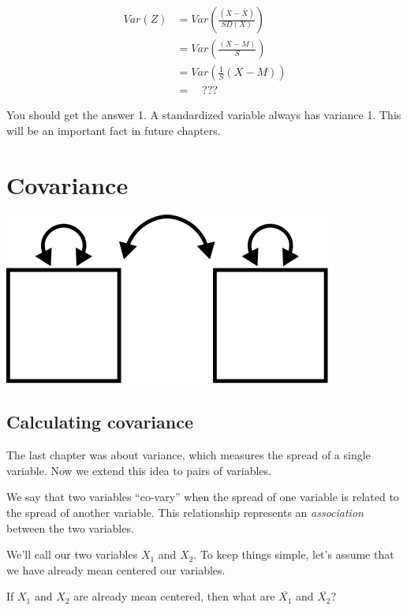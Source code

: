 \documentclass[
]{book}
\begin{document}
\begin{align}
Var(Z) &= Var\left(\frac{\left(X - \overline{X}\right)}{SD(X)}\right) \\
    &= Var\left(\frac{\left(X - M\right)}{S}\right) \\
    &= Var\left(\frac{1}{S}\left(X - M\right)\right) \\
    &= \quad ???
\end{align}

You should get the answer 1. A standardized variable always has variance 1. This will be an important fact in future chapters.

\hypertarget{covariance}{%
\chapter{Covariance}\label{covariance}}

\begin{center}\includegraphics{graphics/covariance} \end{center}

\hypertarget{covariance-calculating}{%
\section{Calculating covariance}\label{covariance-calculating}}

The last chapter was about variance, which measures the spread of a single variable. Now we extend this idea to pairs of variables.

We say that two variables ``co-vary'' when the spread of one variable is related to the spread of another variable. This relationship represents an \emph{association} between the two variables.

We'll call our two variables \(X_{1}\) and \(X_{2}\). To keep things simple, let's assume that we have already mean centered our variables.

If \(X_{1}\) and \(X_{2}\) are already mean centered, then what are \(\overline{X_{1}}\) and \(\overline{X_{2}}\)?
\end{document}
